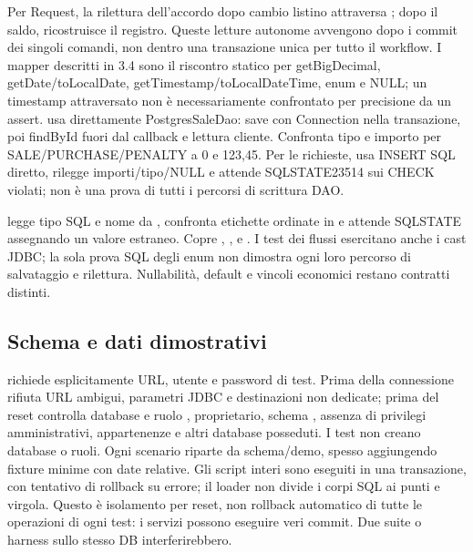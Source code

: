 Per Request, la rilettura dell'accordo dopo cambio listino attraversa
; dopo il saldo,
 ricostruisce il registro. Queste
letture autonome avvengono dopo i commit dei singoli comandi, non dentro
una transazione unica per tutto il workflow. I mapper descritti in 3.4
sono il riscontro statico per getBigDecimal, getDate/toLocalDate,
getTimestamp/toLocalDateTime, enum e NULL; un timestamp attraversato
non è necessariamente confrontato per precisione da un assert.
usa direttamente PostgresSaleDao: save con Connection nella transazione,
poi findById fuori dal callback e lettura cliente. Confronta tipo e importo
per SALE/PURCHASE/PENALTY a 0 e 123,45. Per le richieste,
 usa INSERT SQL diretto,
rilegge importi/tipo/NULL e attende SQLSTATE23514 sui CHECK violati;
non è una prova di tutti i percorsi di scrittura DAO.

 legge tipo SQL e nome da
, confronta etichette ordinate in 
e attende SQLSTATE  assegnando un valore estraneo. Copre
, ,  e .
I test dei flussi esercitano anche i cast JDBC; la sola prova SQL degli enum
non dimostra ogni loro percorso di salvataggio e rilettura. Nullabilità,
default e vincoli economici restano contratti distinti.

\subsection{Schema e dati dimostrativi}\label{sec:test-schema}
 richiede esplicitamente URL, utente e password di test.
Prima della connessione rifiuta URL ambigui, parametri JDBC e destinazioni
non dedicate; prima del reset controlla database e ruolo ,
proprietario, schema , assenza di privilegi amministrativi,
appartenenze e altri database posseduti. I test non creano database o ruoli.
Ogni scenario riparte da schema/demo, spesso aggiungendo fixture minime
con date relative. Gli script interi sono eseguiti in una transazione,
con tentativo di rollback su errore; il loader non divide i corpi SQL ai
punti e virgola. Questo è isolamento per reset, non rollback automatico
di tutte le operazioni di ogni test: i servizi possono eseguire veri commit.
Due suite o harness sullo stesso DB interferirebbero.

